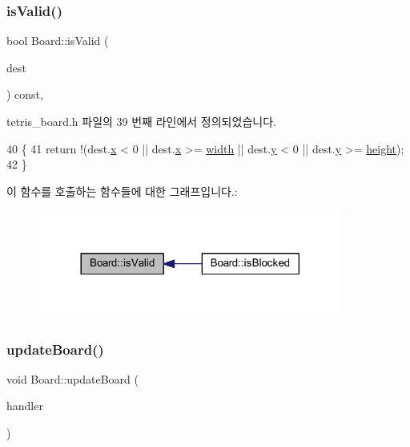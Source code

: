 \subsubsection{\texorpdfstring{is\+Valid()}{isValid()}}
{\footnotesize\ttfamily bool Board\+::is\+Valid (\begin{DoxyParamCaption}\item[{const \mbox{\hyperlink{struct_coord}{Coord}} \&}]{dest }\end{DoxyParamCaption}) const\hspace{0.3cm}{\ttfamily [inline]}, {\ttfamily [private]}}



tetris\+\_\+board.\+h 파일의 39 번째 라인에서 정의되었습니다.


\begin{DoxyCode}
40     \{
41         \textcolor{keywordflow}{return} !(dest.\mbox{\hyperlink{struct_coord_a696eaa744360fc791d0e3b331c549dbe}{x}} < 0 || dest.\mbox{\hyperlink{struct_coord_a696eaa744360fc791d0e3b331c549dbe}{x}} >= \mbox{\hyperlink{class_board_a5c5b64d99e3c653c425206d2babf2f97}{width}} || dest.\mbox{\hyperlink{struct_coord_a214166cca70cef7dda9201689c3e81ab}{y}} < 0 || dest.\mbox{\hyperlink{struct_coord_a214166cca70cef7dda9201689c3e81ab}{y}} >= 
      \mbox{\hyperlink{class_board_a37b65287f3b416ed31b0f15cfd9b3f7c}{height}});
42     \}
\end{DoxyCode}
이 함수를 호출하는 함수들에 대한 그래프입니다.\+:
\nopagebreak
\begin{figure}[H]
\begin{center}
\leavevmode
\includegraphics[width=284pt]{class_board_a5df9c4c18c53b8029e0a080e5e089732_icgraph}
\end{center}
\end{figure}
\mbox{\label{class_board_a06e5188ef352fc5c0e3957895cef6a89}} 
\subsubsection{\texorpdfstring{update\+Board()}{updateBoard()}}
{\footnotesize\ttfamily void Board\+::update\+Board (\begin{DoxyParamCaption}\item[{const \mbox{\hyperlink{class_block_handler}{Block\+Handler}} \&}]{handler }\end{DoxyParamCaption})\hspace{0.3cm}{\ttfamily [inline]}}



